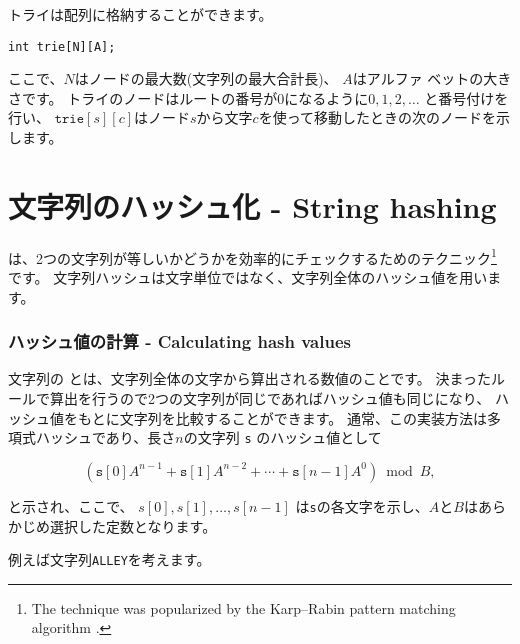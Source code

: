 トライは配列に格納することができます。
\begin{lstlisting}
int trie[N][A];
\end{lstlisting}
ここで、$N$はノードの最大数(文字列の最大合計長)、
$A$はアルファ ベットの大きさです。
トライのノードはルートの番号が0になるように$0,1,2,\ldots$ と番号付けを行い、
$\texttt{trie}[s][c]$はノード$s$から文字$c$を使って移動したときの次のノードを示します。

\section{文字列のハッシュ化 - String hashing}


は、2つの文字列が等しいかどうかを効率的にチェックするためのテクニック\footnote{The technique
was popularized by the Karp–Rabin pattern matching
algorithm \cite{kar87}.}
です。
文字列ハッシュは文字単位ではなく、文字列全体のハッシュ値を用います。

\subsubsection*{ハッシュ値の計算 - Calculating hash values}


文字列の
とは、文字列全体の文字から算出される数値のことです。
決まったルールで算出を行うので2つの文字列が同じであればハッシュ値も同じになり、
ハッシュ値をもとに文字列を比較することができます。
通常、この実装方法は多項式ハッシュであり、長さ$n$の文字列 \texttt{s}
のハッシュ値として

\[(\texttt{s}[0] A^{n-1} + \texttt{s}[1] A^{n-2} + \cdots + \texttt{s}[n-1] A^0) \bmod B  ,\]

と示され、ここで、
$s[0],s[1],\ldots,s[n-1]$
は\texttt{s}の各文字を示し、$A$と$B$はあらかじめ選択した定数となります。

例えば文字列\texttt{ALLEY}を考えます。
\begin{center}
\end{center}

